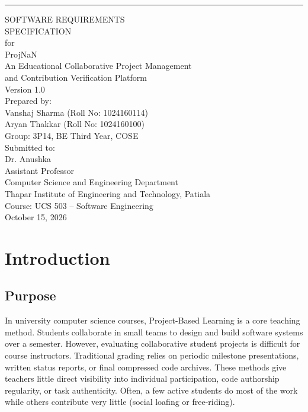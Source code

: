\documentclass{scrreprt}
\def\myversion{1.0}
\begin{document}
\begin{titlepage}
\begin{flushright}
    \rule{\linewidth}{4pt}\vskip0.8cm
    \begin{bfseries}
        \Huge{SOFTWARE REQUIREMENTS\\ SPECIFICATION}\\[0.6cm]
        \Large{for}\\[0.6cm]
        \Huge{ProjNaN}\\[0.3cm]
        \large{An Educational Collaborative Project Management\\ and Contribution Verification Platform}\\[0.8cm]
        \LARGE{Version \myversion}\\[0.9cm]
        \normalsize
        Prepared by:\\[0.2cm]
        Vanshaj Sharma (Roll No: 1024160114)\\
        Aryan Thakkar (Roll No: 1024160100)\\[0.4cm]
        Group: 3P14, BE Third Year, COSE\\[0.8cm]
        Submitted to:\\[0.2cm]
        Dr. Anushka\\
        Assistant Professor\\
        Computer Science and Engineering Department\\
        Thapar Institute of Engineering and Technology, Patiala\\[0.8cm]
        Course: UCS 503 -- Software Engineering\\[0.8cm]
        October 15, 2026
    \end{bfseries}
\end{flushright}
\end{titlepage}

\tableofcontents

\chapter{Introduction}\label{chap:introduction}

\section{Purpose}\label{sec:purpose}
In university computer science courses, Project-Based Learning is a core teaching method. Students collaborate in small teams to design and build software systems over a semester. However, evaluating collaborative student projects is difficult for course instructors. Traditional grading relies on periodic milestone presentations, written status reports, or final compressed code archives. These methods give teachers little direct visibility into individual participation, code authorship regularity, or task authenticity. Often, a few active students do most of the work while others contribute very little (social loafing or free-riding).
\end{document}
